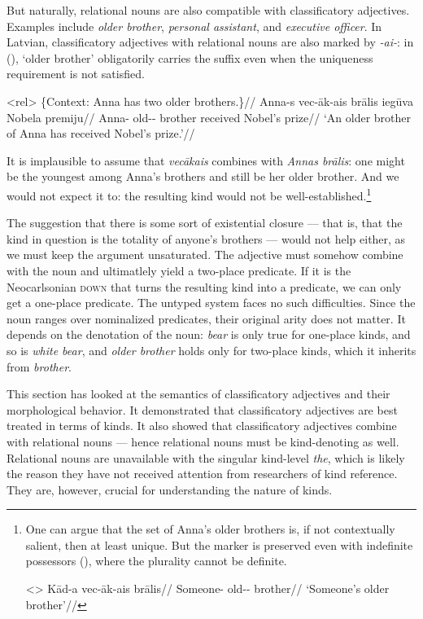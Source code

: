 \documentclass[a4paper, 12pt]{article}
\begin{document}
But naturally, relational nouns are also compatible with classificatory adjectives. Examples include \textit{older brother}, \textit{personal assistant}, and \textit{executive officer}. In Latvian, classificatory adjectives with relational nouns are also marked by \textit{-ai-}: in (\nextx), `older brother' obligatorily carries the suffix even when the uniqueness requirement is not satisfied.

\ex<rel>
    \begingl
        \glpreamble \{Context: Anna has two older brothers.\}//
        \gla Anna-s vec-āk-ais brālis iegūva Nobela premiju//
        \glb Anna-\Gen{} old-\Comp-\Def{} brother received Nobel's prize//
        \glft `An older brother of Anna has received Nobel's prize.'//
    \endgl
\xe

It is implausible to assume that \textit{vecākais} combines with \textit{Annas brālis}: one might be the youngest among Anna's brothers and still be her older brother. And we would not expect it to: the resulting kind would not be well-established.\footnote{One can argue that the set of Anna's older brothers is, if not contextually salient, then at least unique. But the marker is preserved even with indefinite possessors (\nextx), where the plurality cannot be definite.

\ex<>
    \begingl
        \gla Kād-a vec-āk-ais brālis//
        \glb Someone-\Gen{} old-\Comp-\Def{} brother//
        \glft `Someone's older brother'//
    \endgl
\xe
}

The suggestion that there is some sort of existential closure --- that is, that the kind in question is the totality of anyone's brothers --- would not help either, as we must keep the argument unsaturated. The adjective must somehow combine with the noun and ultimatlely yield a two-place predicate. If it is the Neocarlsonian \textsc{down} that turns the resulting kind into a predicate, we can only get a one-place predicate. The untyped system faces no such difficulties. Since the noun ranges over nominalized predicates, their original arity does not matter. It depends on the denotation of the noun: \textit{bear} is only true for one-place kinds, and so is \textit{white bear}, and \textit{older brother} holds only for two-place kinds, which it inherits from \textit{brother}.

This section has looked at the semantics of classificatory adjectives and their morphological behavior. It demonstrated that classificatory adjectives are best treated in terms of kinds. It also showed that classificatory adjectives combine with relational nouns --- hence relational nouns must be kind-denoting as well. Relational nouns are unavailable with the singular kind-level \textit{the}, which is likely the reason they have not received attention from researchers of kind reference. They are, however, crucial for understanding the nature of kinds.
\end{document}
